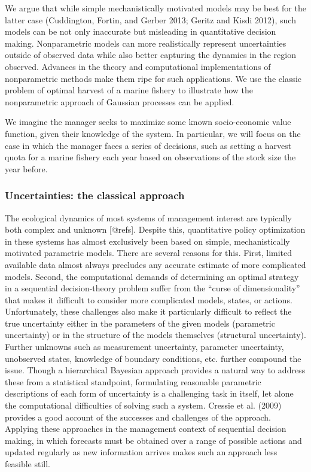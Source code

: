 \documentclass[author-year, review]{elsarticle} %
\begin{document}
We argue that while simple mechanistically motivated models may be best
for the latter case (Cuddington, Fortin, and Gerber 2013; Geritz and
Kisdi 2012), such models can be not only inaccurate but misleading in
quantitative decision making. Nonparametric models can more
realistically represent uncertainties outside of observed data while
also better capturing the dynamics in the region observed. Advances in
the theory and computational implementations of nonparametric methods
make them ripe for such applications. We use the classic problem of
optimal harvest of a marine fishery to illustrate how the nonparametric
approach of Gaussian processes can be applied.

We imagine the manager seeks to maximize some known socio-economic value
function, given their knowledge of the system. In particular, we will
focus on the case in which the manager faces a series of decisions, such
as setting a harvest quota for a marine fishery each year based on
observations of the stock size the year before.

\subsubsection{Uncertainties: the classical approach}

The ecological dynamics of most systems of management interest are
typically both complex and unknown {[}@refs{]}. Despite this,
quantitative policy optimization in these systems has almost exclusively
been based on simple, mechanistically motivated parametric models. There
are several reasons for this. First, limited available data almost
always precludes any accurate estimate of more complicated models.
Second, the computational demands of determining an optimal strategy in
a sequential decision-theory problem suffer from the ``curse of
dimensionality'' that makes it difficult to consider more complicated
models, states, or actions. Unfortunately, these challenges also make it
particularly difficult to reflect the true uncertainty either in the
parameters of the given models (parametric uncertainty) or in the
structure of the models themselves (structural uncertainty). Further
unknowns such as measurement uncertainty, parameter uncertainty,
unobserved states, knowledge of boundary conditions, etc. further
compound the issue. Though a hierarchical Bayesian approach provides a
natural way to address these from a statistical standpoint, formulating
reasonable parametric descriptions of each form of uncertainty is a
challenging task in itself, let alone the computational difficulties of
solving such a system. Cressie et al. (2009) provides a good account of
the successes and challenges of the approach. Applying these approaches
in the management context of sequential decision making, in which
forecasts must be obtained over a range of possible actions and updated
regularly as new information arrives makes such an approach less
feasible still.
\end{document}
